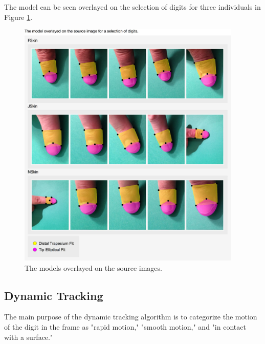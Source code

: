 The model can be seen overlayed on the selection of digits for three individuals in Figure \ref{fig:FingertipModelResult}.

\begin{figure}[h!]
  \centering
    \includegraphics[width=0.95\textwidth]{Chapter4/Figs/Model_Overlayed.jpg}
    \caption{The models overlayed on the source images.}\label{fig:FingertipModelResult}
\end{figure}

\clearpage
\subsection{Dynamic Tracking}\label{sec:DynamicTracking}
The main purpose of the dynamic tracking algorithm is to categorize the motion of the digit in the frame as "rapid motion," "smooth motion," and "in contact with a surface."

